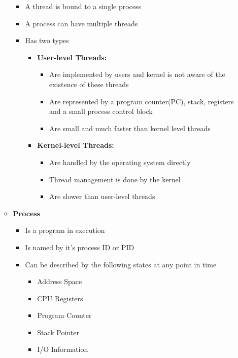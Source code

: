\documentclass[12pt]{article}
\begin{document}
\begin{enumerate}[1.]
\begin{itemize}
\begin{itemize}
            \item A thread is bound to a single process
            \item A process can have multiple threads
            \item Has two types
            \begin{itemize}
                \item \textbf{User-level Threads:}

                \begin{itemize}
                    \item Are implemented by users and kernel is not aware of the existence of these threads
                    \item Are represented by a program counter(PC), stack, registers and a small process control block
                    \item Are small and much faster than kernel level threads
                \end{itemize}
                \item \textbf{Kernel-level Threads:}

                \begin{itemize}
                    \item Are handled by the operating system directly
                    \item Thread management is done by the kernel
                    \item Are slower than user-level threads
                \end{itemize}
            \end{itemize}
        \end{itemize}

        \item \textbf{Process}

        \begin{itemize}
            \item Is a program in execution
            \item Is named by it's process ID or PID
            \item Can be described by the following states at any point in time

            \begin{itemize}
                \item Address Space
                \item CPU Registers
                \item Program Counter
                \item Stack Pointer
                \item I/O Information
            \end{itemize}


\end{itemize}
\end{itemize}
\end{enumerate}
\end{document}
